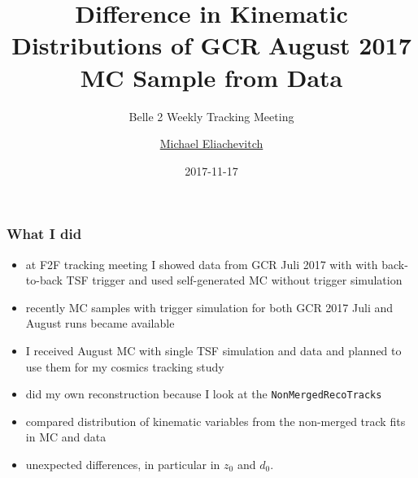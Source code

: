 \documentclass[18pt]{beamer}
\title{Difference in Kinematic Distributions of GCR August  2017 MC Sample from Data}
\subtitle{Belle 2 Weekly Tracking Meeting}
\author{\underline{Michael Eliachevitch}}
\date{2017-11-17}
\institute{ETP - KIT}
\begin{document}
  
  \begin{frame}
  \titlepage
\end{frame}

\begin{frame}
  \frametitle{What I did}
  \begin{itemize}
  \item at F2F tracking meeting I showed data from GCR Juli 2017 with with back-to-back TSF trigger and used self-generated MC without trigger simulation
  \item recently MC samples with trigger simulation for both GCR 2017 Juli and August runs became available
  \item I received August MC with single TSF simulation and data and planned to use them for my cosmics tracking study
  \item did my own reconstruction because I look at the \texttt{NonMergedRecoTracks}
  \item compared  distribution of kinematic variables from the non-merged track fits in MC and data
  \item unexpected differences, in particular in $z_0$ and $d_0$.
  \end{itemize}
\end{frame}
\end{document}
